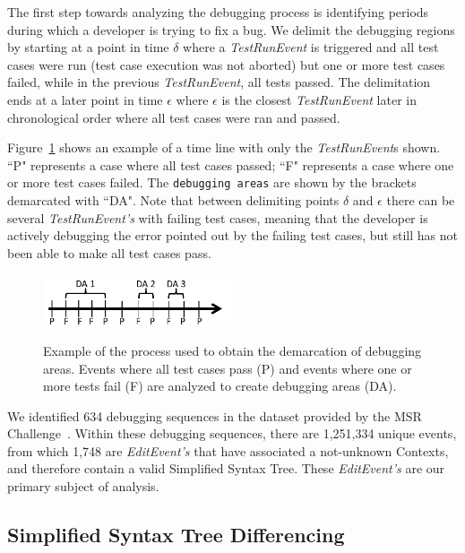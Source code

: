 \documentclass[sigconf]{acmart}
\begin{document}
The first step towards analyzing the debugging
process is identifying periods during which a 
developer is trying to fix a bug.
We delimit the debugging regions by starting at a point
in time $\delta$ where a \textit{TestRunEvent} is triggered and 
all test cases were run (test case execution
was not aborted) but one or more test cases failed, while in the 
previous \textit{TestRunEvent}, all tests passed.
The delimitation ends at a later point in time $\epsilon $ where 
$\epsilon $ is the closest \textit{TestRunEvent} later in
chronological order
where all test cases were ran and passed.

Figure~\ref{demarcations} shows an example of a time line
with only the \textit{TestRunEvent}s shown. ``P" represents a case
where all test cases passed; ``F" represents a case where one
or more test cases failed. The \texttt{debugging areas} are shown by
the brackets demarcated with ``DA". 
Note that between delimiting points $\delta$ and $\epsilon$ there can be 
several \textit{TestRunEvent's} with failing test cases, meaning
that the developer is actively debugging the error pointed out
by the failing test cases, but still has not been able to make
all test cases pass.

\begin{figure}[h]
\caption{Example of the process used to obtain the demarcation of
debugging areas. Events where all test cases pass (P) and
events where one or more tests fail (F) are analyzed to create
debugging areas (DA).}
\centering
\includegraphics[width=0.5\textwidth]{images/demarcations.png}
\label{demarcations}
\end{figure}

We identified 634 debugging sequences in the dataset 
provided by the MSR Challenge~\cite{msr18challenge}.
Within these debugging sequences, there are 1,251,334
unique events, from which 1,748 are \textit{EditEvent's}
that have associated a not-unknown Contexts, and therefore 
contain a valid Simplified Syntax Tree. These \textit{EditEvent's} 
are our primary subject of analysis.

\subsection{Simplified Syntax Tree Differencing}
\label{sstDiff}
\end{document}
